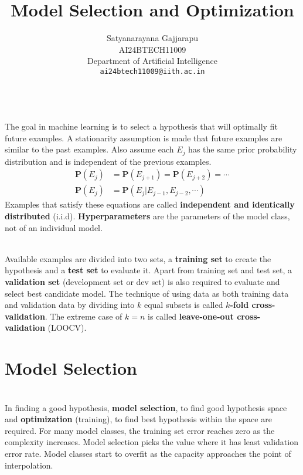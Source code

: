 \documentclass{article}
\title{Model Selection and Optimization}
\author{%
Satyanarayana Gajjarapu \\
AI24BTECH11009 \\
Department of Artificial Intelligence \\
\texttt{ai24btech11009@iith.ac.in} \\
}
\begin{document}
\maketitle
\begin{paragraph}
\\
The goal in machine learning is to select a hypothesis that will optimally fit future examples. A stationarity assumption is made that future examples are similar to the past examples. Also assume each $E_j$ has the same prior probability distribution and is independent of the previous examples.
\begin{align*}
    \textbf{P}(E_j) & = \textbf{P}(E_{j + 1}) = \textbf{P}(E_{j + 2}) = \cdots \\
    \textbf{P}(E_j) & = \textbf{P}(E_j|E_{j - 1},E_{j - 2},\cdots)
\end{align*}
Examples that satisfy these equations are called \textbf{independent and identically distributed} (i.i.d). \textbf{Hyperparameters} are the parameters of the model class, not of an individual model. 
\end{paragraph}
\begin{paragraph}
\\
Available examples are divided into two sets, a \textbf{training set} to create the hypothesis and a \textbf{test set} to evaluate it. Apart from training set and test set, a \textbf{validation set} (development set or dev set) is also required to evaluate and select best candidate model. The technique of using data as both training data and validation data by dividing into $k$ equal subsets is called \textbf{$k$-fold cross-validation}. The extreme case of $k = n$ is called \textbf{leave-one-out cross-validation} (LOOCV). 
\end{paragraph}
\section{Model Selection}
\begin{paragraph}
\\
In finding a good hypothesis, \textbf{model selection}, to find good hypothesis space and \textbf{optimization} (training), to find best hypothesis within the space are required. For many model classes, the training set error reaches zero as the complexity increases. Model selection picks the value where it has least validation error rate. Model classes start to overfit as the capacity approaches the point of interpolation.
\end{paragraph}
\end{document}
